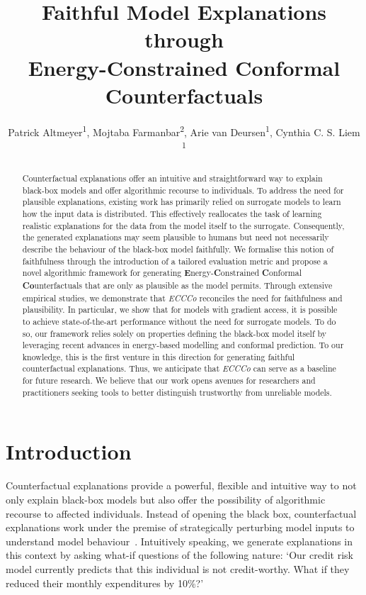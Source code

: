 \documentclass[letterpaper]{article} %
\title{Faithful Model Explanations through\\
Energy-Constrained Conformal Counterfactuals}
\author{
    Patrick Altmeyer\textsuperscript{\rm 1},
    Mojtaba Farmanbar\textsuperscript{\rm 2},
    Arie van Deursen\textsuperscript{\rm 1},
    Cynthia C. S. Liem \textsuperscript{\rm 1}
}
\begin{document}
\maketitle

\begin{abstract}
    Counterfactual explanations offer an intuitive and straightforward way to explain black-box models and offer algorithmic recourse to individuals. To address the need for plausible explanations, existing work has primarily relied on surrogate models to learn how the input data is distributed. This effectively reallocates the task of learning realistic explanations for the data from the model itself to the surrogate. Consequently, the generated explanations may seem plausible to humans but need not necessarily describe the behaviour of the black-box model faithfully. We formalise this notion of faithfulness through the introduction of a tailored evaluation metric and propose a novel algorithmic framework for generating \textbf{E}nergy-\textbf{C}onstrained \textbf{C}onformal \textbf{Co}unterfactuals that are only as plausible as the model permits. Through extensive empirical studies, we demonstrate that \textit{ECCCo} reconciles the need for faithfulness and plausibility. In particular, we show that for models with gradient access, it is possible to achieve state-of-the-art performance without the need for surrogate models. To do so, our framework relies solely on properties defining the black-box model itself by leveraging recent advances in energy-based modelling and conformal prediction. To our knowledge, this is the first venture in this direction for generating faithful counterfactual explanations. Thus, we anticipate that \textit{ECCCo} can serve as a baseline for future research. We believe that our work opens avenues for researchers and practitioners seeking tools to better distinguish trustworthy from unreliable models.
\end{abstract}

\section{Introduction}\label{intro}

Counterfactual explanations provide a powerful, flexible and intuitive way to not only explain black-box models but also offer the possibility of algorithmic recourse to affected individuals. Instead of opening the black box, counterfactual explanations work under the premise of strategically perturbing model inputs to understand model behaviour~\citep{wachter2017counterfactual}. Intuitively speaking, we generate explanations in this context by asking what-if questions of the following nature: `Our credit risk model currently predicts that this individual is not credit-worthy. What if they reduced their monthly expenditures by 10\%?'
\end{document}

